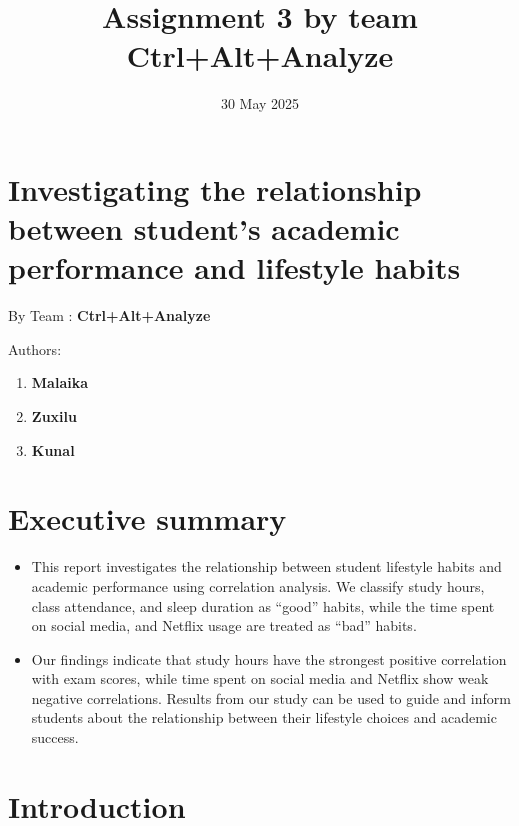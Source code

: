 \documentclass[
  11pt,
  a4paper,
]{article}
\title{Assignment 3 by team Ctrl+Alt+Analyze}
\date{30 May 2025}
\author{\sf{\Large\textbf{Malaika} \\[0.5cm]}{\Large\textbf{Kunal} \\[0.5cm]}{\Large\textbf{ZuxiLu} \\[0.5cm]}}
\makeatletter
\providecommand{\tightlist}{%
  \setlength{\itemsep}{0pt}\setlength{\parskip}{0pt}}\usepackage{longtable,booktabs,array}
\renewcommand*\contentsname{Table of contents}
\newcommand\contentsname{Table of contents}
\def\maketitle{\front{\expandafter{\@title}}{\@author}{\@organization}}
\makeatother
\begin{document}
\maketitle

\renewcommand*\contentsname{Table of contents}
{
\hypersetup{linkcolor=}
\setcounter{tocdepth}{3}
\tableofcontents
}

\newpage

\section{Investigating the relationship between student's academic
performance and lifestyle
habits}\label{investigating-the-relationship-between-students-academic-performance-and-lifestyle-habits}

By Team : \textbf{Ctrl+Alt+Analyze}

Authors:

\begin{enumerate}
\def\labelenumi{\arabic{enumi}.}
\item
  \textbf{Malaika}
\item
  \textbf{Zuxilu}
\item
  \textbf{Kunal}
\end{enumerate}

\section{Executive summary}\label{executive-summary}

\begin{itemize}
\tightlist
\item
  This report investigates the relationship between student lifestyle
  habits and academic performance using correlation analysis. We
  classify study hours, class attendance, and sleep duration as ``good''
  habits, while the time spent on social media, and Netflix usage are
  treated as ``bad'' habits.
\item
  Our findings indicate that study hours have the strongest positive
  correlation with exam scores, while time spent on social media and
  Netflix show weak negative correlations. Results from our study can be
  used to guide and inform students about the relationship between their
  lifestyle choices and academic success.
\end{itemize}

\section{Introduction}\label{introduction}
\end{document}
